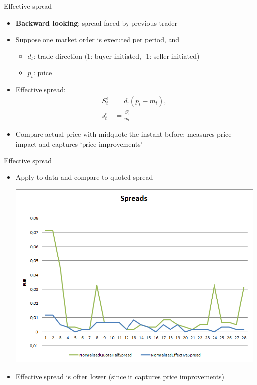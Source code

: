 \begin{frame}{Effective spread}
	\begin{itemize}
		\item \textbf{Backward looking}: spread faced by previous trader
		\item Suppose one market order is executed per period, and
		\begin{itemize}
			\item $d_t$: trade direction (1: buyer-initiated, -1: seller initiated)
			\item $p_t$:  price
		\end{itemize}
		\item \alert{Effective spread}: 
		\begin{align*}
		S^e_t & = d_t(p_t-m_{t}), \\
		s^e_t & = \frac{S^e_t}{m_{t}}
		\end{align*}
		\item Compare actual price with midquote the instant before: measures price impact and captures `price improvements'
	\end{itemize}
\end{frame}


\begin{frame}{Effective spread}
	\begin{itemize}
		\item Apply to data and compare to quoted spread
		\begin{center}
			\includegraphics[scale=0.39]{pics/L2_effectivespread}
		\end{center}
		\item Effective spread is often lower (since it captures price improvements)
	\end{itemize}
\end{frame}


